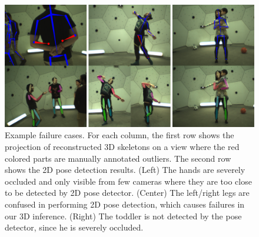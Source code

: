 

\begin{figure}[t]
	\centering
	\includegraphics[width=0.8\linewidth]{figures/FailureCases3}
	\caption{Example failure cases. For each column, the first row shows the projection of reconstructed 3D skeletons on a view where the red colored parts are manually annotated outliers. The second row shows the 2D pose detection results. (Left) The hands are severely occluded and only visible from few cameras where they are too close to be detected by 2D pose detector. (Center) The left/right legs are confused in performing 2D pose detection, which causes failures in our 3D inference. (Right) The toddler is not detected by the pose detector, since he is severely occluded. }\label{fig:failures}
\end{figure}


